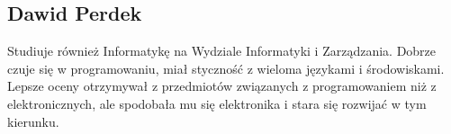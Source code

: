 \subsection{Dawid Perdek}
Studiuje również Informatykę na Wydziale Informatyki i Zarządzania. Dobrze czuje się w programowaniu, miał styczność z wieloma językami i środowiskami. Lepsze oceny otrzymywał z przedmiotów związanych z programowaniem niż z elektronicznych, ale spodobała mu się elektronika i stara się rozwijać w tym kierunku.
